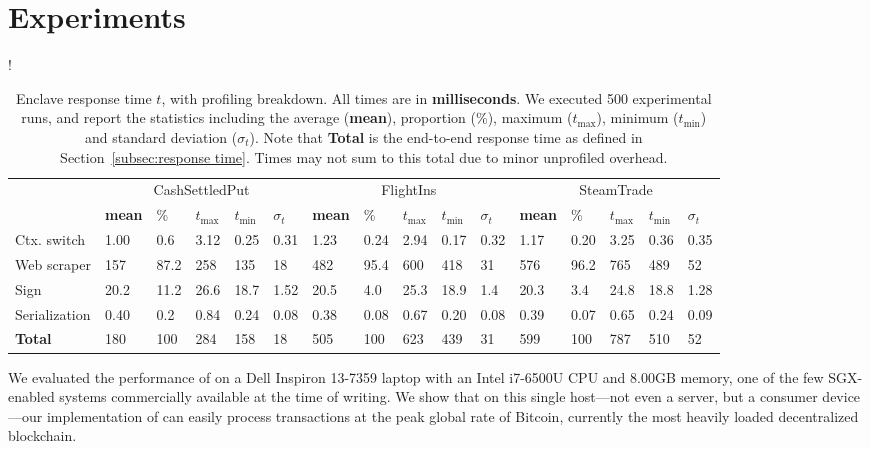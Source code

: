 \section{Experiments}
\label{sec:experiments}

\begin{table*}
\resizebox{\linewidth} {!}{
\begin{tabular}{l|lllll|lllll|lllll}
\toprule
& \multicolumn{5}{c|}{\sf CashSettledPut} &
  \multicolumn{5}{c|}{\sf FlightIns} &
  \multicolumn{5}{c}{\sf SteamTrade} \\
    & \textbf{mean} & \% & $t_{\max}$ & $t_{\min}$ & $\sigma_t$ & \textbf{mean}
    & \% & $t_{\max}$ & $t_{\min}$ & $\sigma_t$ & \textbf{mean} & \% & $t_{\max}$
    & $t_{\min}$ & $\sigma_t$\\
\midrule
    Ctx. switch & 1.00 & 0.6 & 3.12 & 0.25 & 0.31 
                & 1.23 & 0.24 & 2.94 & 0.17 & 0.32 
                & 1.17 & 0.20 & 3.25 & 0.36 & 0.35\\
    Web scraper & 157  & 87.2 & 258 & 135 & 18 
                & 482  & 95.4 & 600 & 418 & 31 
                & 576  & 96.2 & 765 & 489 & 52\\
    Sign        & 20.2 & 11.2 & 26.6 & 18.7 & 1.52 
                & 20.5 & 4.0 & 25.3 & 18.9 & 1.4 
                & 20.3 & 3.4 & 24.8 & 18.8 & 1.28\\
    Serialization 
                & 0.40 & 0.2 & 0.84 & 0.24 & 0.08 
                & 0.38 & 0.08 & 0.67 & 0.20 & 0.08 
                & 0.39 & 0.07 & 0.65 & 0.24 & 0.09\\
\midrule
\midrule
    \textbf{Total} 
                & 180 & 100 & 284 & 158 & 18 
                & 505 & 100 & 623 & 439 & 31 
                & 599 & 100 & 787 & 510 & 52 \\
\bottomrule	
\end{tabular}
}
\caption{Enclave response time $t$, with profiling breakdown. All times are in {\bf milliseconds}.
We executed 500 experimental runs, and report
the statistics including 
the average ({\bf mean}), proportion (\%), maximum ($t_{\max}$),
minimum ($t_{\min}$) and standard deviation ($\sigma_t$). Note that {\bf Total} is the end-to-end response time as 
defined in Section~\ref{subsec:response time}. Times may not
sum to this total due to minor unprofiled overhead.}
\label{tab:eval_profiling}
\end{table*}

We evaluated the performance of \tc on a Dell Inspiron 13-7359 laptop 
with an Intel i7-6500U CPU and 8.00GB memory, one of the few SGX-enabled systems commercially available at the
time of writing. We
show that on this single host---not even a server, but a consumer device---our implementation of \tc can easily process
transactions at the peak global rate of Bitcoin, currently the most heavily loaded decentralized blockchain. 

